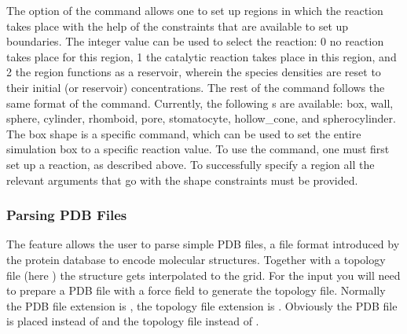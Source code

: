 \begin{essyntax}
  \begin{features}
  \end{features}
\end{essyntax}
The  option of the  command allows one 
to set up regions in which the reaction takes place with the help of the 
constraints that are available to set up boundaries. The integer value 
 can be used to select the reaction: 0 no reaction takes
place for this region, 1 the catalytic reaction takes place in this region, and 
2 the region functions as a reservoir, wherein the species densities are reset
to their initial (or reservoir) concentrations. The rest of the command follows 
the same format of the  command. Currently, the 
following s are available: box, wall, sphere, cylinder, rhomboid, 
pore, stomatocyte, hollow_cone, and spherocylinder. The box shape is a  specific command, which
can be used to set the entire simulation box to a specific reaction value. To
use the  command, one must first set up
a reaction, as described above. To successfully specify a region all the 
relevant arguments that go with the shape constraints must be provided.

\subsubsection{\label{sssec:ek-pdb-parse}Parsing PDB Files}

\begin{essyntax}
  \begin{features}
  \end{features}
\end{essyntax}
The  feature allows the user to parse simple PDB files, a file format introduced by the protein database to encode molecular structures. Together with a topology file (here ) the structure gets interpolated to the  grid. For the input you will need to prepare a PDB file with a  force field to generate the topology file. Normally the PDB file extension is , the topology file extension is . Obviously the PDB file is placed instead of  and the topology file instead of . 

